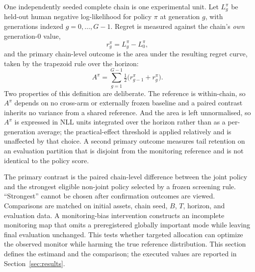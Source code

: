 One independently seeded complete chain is one experimental unit. Let $L_g^{\pi}$ be held-out human negative log-likelihood for policy $\pi$ at generation $g$, with generations indexed $g=0,\ldots,G-1$. Regret is measured against the chain's \emph{own} generation-0 value,
\[
r_g^{\pi}=L_g^{\pi}-L_0^{\pi},
\]
and the primary chain-level outcome is the area under the resulting regret curve, taken by the trapezoid rule over the horizon:
\[
A^{\pi}=\sum_{g=1}^{G-1}\tfrac{1}{2}\bigl(r_{g-1}^{\pi}+r_g^{\pi}\bigr).
\]
Two properties of this definition are deliberate. The reference is within-chain, so $A^{\pi}$ depends on no cross-arm or externally frozen baseline and a paired contrast inherits no variance from a shared reference. And the area is left unnormalised, so $A^{\pi}$ is expressed in NLL units integrated over the horizon rather than as a per-generation average; the practical-effect threshold is applied relatively and is unaffected by that choice. A second primary outcome measures tail retention on an evaluation partition that is disjoint from the monitoring reference and is not identical to the policy score.

The primary contrast is the paired chain-level difference between the joint policy and the strongest eligible non-joint policy selected by a frozen screening rule. ``Strongest'' cannot be chosen after confirmation outcomes are viewed. Comparisons are matched on initial assets, chain seed, $B$, $T$, horizon, and evaluation data. A monitoring-bias intervention constructs an incomplete monitoring map that omits a preregistered globally important mode while leaving final evaluation unchanged. This tests whether targeted allocation can optimize the observed monitor while harming the true reference distribution. This section defines the estimand and the comparison; the executed values are reported in Section~\ref{sec:results}.
